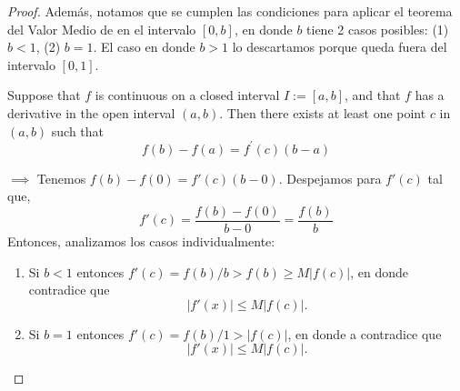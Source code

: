 \begin{proof}
  Además, notamos que se cumplen las condiciones para aplicar el teorema del Valor Medio de \cite{bartle2000introduction} en el intervalo $[0,b]$, en donde $b$ tiene 2 casos posibles: (1) $b<1$, (2) $b=1$. El caso en donde $b>1$ lo descartamos porque queda fuera del intervalo $[0,1]$.
\begin{tcolorbox}[colback=gray!15,colframe=gray!1!gray,title=Teorema del Valor Medio 6.2.4 de \cite{bartle2000introduction}.]
Suppose that $f$ is continuous on a closed interval $I:=[a, b]$, and that $f$ has a derivative in the open interval $(a, b) .$ Then there exists at least one point $c$ in $(a, b)$ such that
$$
f(b)-f(a)=f^{\prime}(c)(b-a)
$$
\end{tcolorbox}
 $\implies$ Tenemos $f(b)-f(0)=f'(c)(b-0)$. Despejamos para $f'(c)$ tal que, 
 $$f'(c)=\frac{f(b)-f(0)}{b-0}=\frac{f(b)}{b}$$
 Entonces, analizamos los casos individualmente: 
\begin{enumerate}
    \item Si $b<1$ entonces $f'(c)=f(b)/ b>f(b)\geq M|f(c)|$, en donde contradice que $$|f'(x)|\leq M|f(c)|.$$
    \item Si $b=1$ entonces $f'(c)=f(b)/1>|f(c)|$, en donde a contradice que $$|f'(x)|\leq M|f(c)|.$$
\end{enumerate}
 \end{proof}